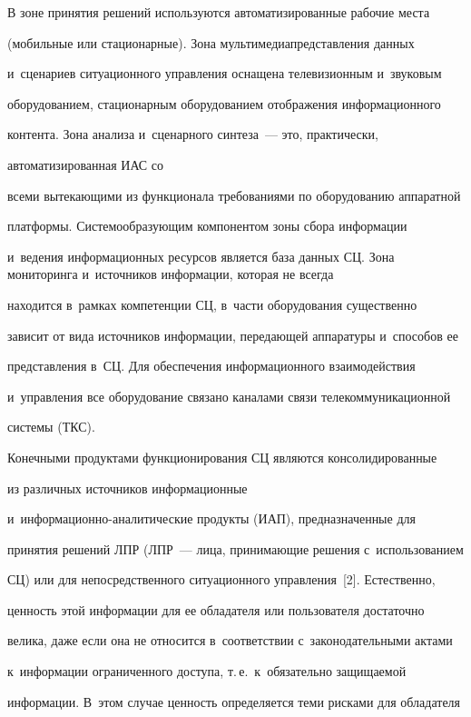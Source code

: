   

  В зоне принятия решений используются автоматизированные рабочие места 

(мобильные или стационарные). Зона мультимедиапредставления данных 

и~сценариев ситуационного управ\-ле\-ния оснащена телевизионным и~звуковым 

оборудованием, стационарным оборудованием отображения информационного 

контента. Зона анализа и~сценарного синтеза~--- это, практически, 

автоматизированная ИАС со 

всеми вытекающими из функционала требованиями по оборудованию аппаратной 

платформы. Системообразующим компонентом зоны сбора информации 

и~ведения информационных ресурсов является база данных СЦ. Зона мониторинга и~источников информации, которая не всегда 

находится в~рамках компетенции СЦ, в~час\-ти оборудования существенно 

зависит от вида источников информации, передающей аппаратуры и~способов ее 

представления в~СЦ. Для обеспечения информационного взаимодействия 

и~управления все оборудование связано каналами связи телекоммуникационной 

системы (ТКС).

  

  Конечными продуктами функционирования СЦ являются консолидированные 

из различных источников информационные  

и~ин\-фор\-ма\-ци\-он\-но-ана\-ли\-ти\-че\-ские продукты (ИАП), предназначенные для 

принятия решений ЛПР (ЛПР~--- лица, принимающие решения с~использованием 

СЦ) или для непосредственного ситуационного управления~[2]. Естественно, 

ценность этой информации для ее обладателя или пользователя достаточно 

велика, даже если она не относится в~соответствии с~законодательными актами 

к~информации ограниченного доступа, т.\,е.\ к~обязательно защищаемой 

информации. В~этом случае ценность определяется теми рисками для обладателя 

